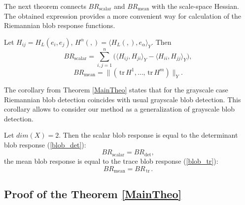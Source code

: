 \documentclass{llncs}
\newcommand{\FRScalar}{BR_{\mathrm{scalar}}}
\newcommand{\FRMean}{BR_{\mathrm{mean}}}
\newcommand {\tr}{{\,}\mathrm{tr}{\,}}
\begin{document}
The next theorem connects $\FRScalar$ and $\FRMean$ with the scale-space Hessian. The obtained expression provides a more convenient way for calculation of the Riemannian blob response functions.

\begin{theorem} \label{MainTheo}
Let $H_{ij}=H_L (e_i,e_j)$, $H^\alpha (,) =\langle H_L (,),e_\alpha {\rangle}_Y$. Then
\begin{equation*}\FRScalar=\sum_{i,j=1}^{n} \Big( \langle H_{ij},H_{ji}{\rangle}_Y-\langle H_{ii},H_{jj}{\rangle}_Y \Big) ,\end{equation*}
\begin{equation*}\FRMean=\| (\tr H^1,\dots,\tr H^m )\|_Y.\end{equation*}
\end{theorem}

The corollary from Theorem \ref{MainTheo} states that for the grayscale case Riemannian blob detection coincides with usual grayscale blob detection. This corollary allows to consider our method as a generalization of grayscale blob detection.

\begin{corollary}\label{GrayscaleCol}
Let $dim(X)=2$. Then the scalar blob response is equal to the determinant blob response (\ref{blob_det}):
\begin{equation*}\FRScalar=BR_{\det},\end{equation*}
the mean blob response is equal to the trace blob response (\ref{blob_tr}):
\begin{equation*}\FRMean=BR_{\tr}.\end{equation*}
\end{corollary}

\subsection{Proof of the Theorem \ref{MainTheo}}
\end{document}
